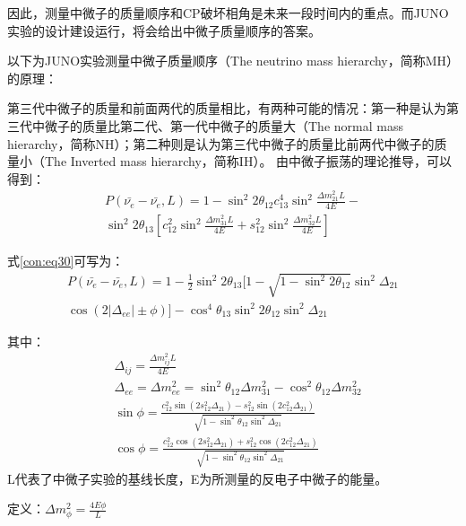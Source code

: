 \documentclass[10pt,a4paper]{article}
\begin{document}
因此，测量中微子的质量顺序和CP破坏相角是未来一段时间内的重点。而JUNO实验的设计建设运行，将会给出中微子质量顺序的答案。

以下为JUNO实验测量中微子质量顺序（The neutrino mass hierarchy，简称MH）的原理\cite{2016Neutrino}：

第三代中微子的质量和前面两代的质量相比，有两种可能的情况：第一种是认为第三代中微子的质量比第二代、第一代中微子的质量大（The normal mass hierarchy，简称NH）；第二种则是认为第三代中微子的质量比前两代中微子的质量小（The Inverted mass hierarchy，简称IH）。
由中微子振荡的理论推导，可以得到\cite{Ternes:2020bvy}：
\begin{equation}
 \begin{split}
    \label{con:eq30}
     P(\bar{\nu_e}-\bar{\nu_e},L)=1-{\sin^2{2\theta_{12}}} c_{13}^4\sin^2{\frac{\Delta{m_{21}^2}L}{4E}}-\\
\sin^2{2\theta_{13}}[c_{12}^2\sin^2{\frac{\Delta{m_{31}^2}L}{4E}}+s_{12}^2\sin^2{\frac{\Delta{m_{32}^2}L}{4E}}]
 \end{split}
\end{equation}


式\eqref{con:eq30}可写为：
 \begin{equation}
 \label{con:eq24}
 \begin{split}
     P(\bar{\nu_e}-\bar{\nu_e},L)=1-\frac{1}{2}{\sin^2{2\theta_{13}}}[1-\sqrt{1-\sin^2{2\theta_{12}}}\sin^2{\Delta_{21}}\\\cos(2|\Delta_{ee}|\pm\phi)] -\cos^4{\theta_{13}}\sin^2{2\theta_{12}}\sin^2{\Delta_{21}} 
 \end{split}
 \end{equation}

其中：
\[
\begin{split}
&\Delta_{ij}=\frac{\Delta{m_{ij}^2}L}{4E}\\
&\Delta_{ee}=\Delta{m_{ee}^2}=\sin^2{\theta_{12}}\Delta{m_{31}^2}-\cos^2{\theta_{12}}\Delta{m_{32}^2}\\
&\sin\phi=\frac{c_{12}^2\sin(2s_{12}^2\Delta_{21})-s_{12}^2\sin(2c_{12}^2\Delta_{21})}{\sqrt{1-\sin^2\theta_{12}\sin^2\Delta_{21}}}\\&\cos\phi=\frac{c_{12}^2\cos(2s_{12}^2\Delta_{21})+s_{12}^2\cos(2c_{12}^2\Delta_{21})}{\sqrt{1-\sin^2\theta_{12}\sin^2\Delta_{21}}}
\end{split}
\]
L代表了中微子实验的基线长度，E为所测量的反电子中微子的能量。


定义：$\Delta{m_{\phi}^2}=\frac{4E\phi}{L}$
\end{document}
